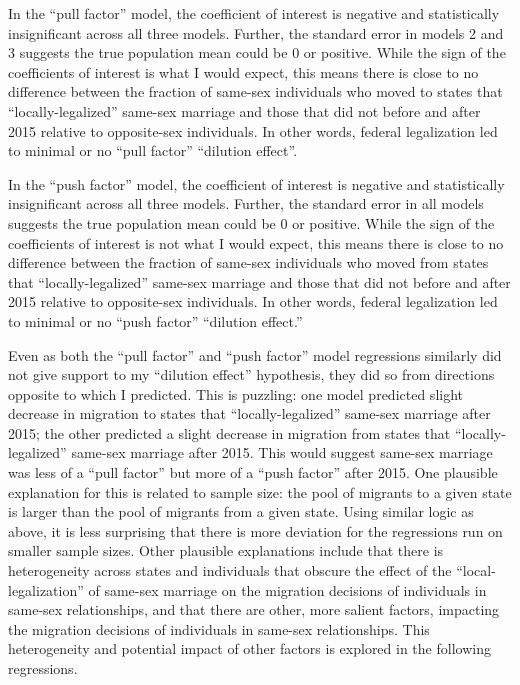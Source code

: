 \documentclass[12pt,letterpaper]{article}
\begin{document}
In the “pull factor” model, the coefficient of interest is negative and statistically insignificant across all three models. Further, the standard error in models 2 and 3 suggests the true population mean could be 0 or positive. While the sign of the coefficients of interest is what I would expect, this means there is close to no difference between the fraction of same-sex individuals who moved to states that “locally-legalized” same-sex marriage and those that did not before and after 2015 relative to opposite-sex individuals. In other words, federal legalization led to minimal or no “pull factor” “dilution effect”. 

In the “push factor” model, the coefficient of interest is negative and statistically insignificant across all three models. Further, the standard error in all models suggests the true population mean could be 0 or positive. While the sign of the coefficients of interest is not what I would expect, this means there is close to no difference between the fraction of same-sex individuals who moved from states that “locally-legalized” same-sex marriage and those that did not before and after 2015 relative to opposite-sex individuals. In other words, federal legalization led to minimal or no “push factor” “dilution effect.”  

Even as both the “pull factor” and “push factor” model regressions similarly did not give support to my “dilution effect” hypothesis, they did so from directions opposite to which I predicted. This is puzzling: one model predicted slight decrease in migration to states that “locally-legalized” same-sex marriage after 2015; the other predicted a slight decrease in migration from states that “locally-legalized” same-sex marriage after 2015. This would suggest same-sex marriage was less of a “pull factor” but more of a “push factor” after 2015. One plausible explanation for this is related to sample size: the pool of migrants to a given state is larger than the pool of migrants from a given state. Using similar logic as above, it is less surprising that there is more deviation for the regressions run on smaller sample sizes. Other plausible explanations include that there is heterogeneity across states and individuals that obscure the effect of the “local-legalization” of same-sex marriage on the migration decisions of individuals in same-sex relationships, and that there are other, more salient factors, impacting the migration decisions of individuals in same-sex relationships. This heterogeneity and potential impact of other factors is explored in the following regressions. 
\end{document}
